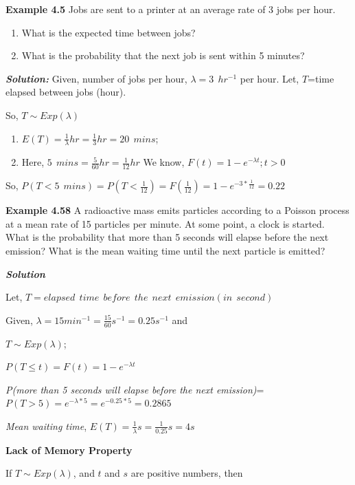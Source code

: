 \documentclass[
]{article}
\providecommand{\tightlist}{%
  \setlength{\itemsep}{0pt}\setlength{\parskip}{0pt}}
\begin{document}
\textbf{Example 4.5}\citep{baron_probability_2019} Jobs are sent to a printer at an average rate of 3 jobs per hour.

\begin{enumerate}
\def\labelenumi{(\alph{enumi})}
\item
  What is the expected time between jobs?
\item
  What is the probability that the next job is sent within 5 minutes?
\end{enumerate}

\textbf{\emph{Solution:}} Given, number of jobs per hour, \(\lambda=3\ \ hr^{-1}\) per hour. Let, \(T\)=time elapsed between jobs (hour).

So, \(T\sim Exp(\lambda)\)

\begin{enumerate}
\def\labelenumi{(\alph{enumi})}
\tightlist
\item
  \(E(T)=\frac{1}{\lambda} hr=\frac{1}{3} hr=20\ \ mins\);
\item
  Here, \(5 \ \ mins=\frac{5}{60} hr=\frac{1}{12} hr\) We know, \(F(t)=1-e^{-\lambda t}; t>0\)
\end{enumerate}

So, \(P(T<5 \ \ mins)=P(T<\frac{1}{12})=F(\frac{1}{12})=1-e^{-3*\frac{1}{12}}=0.22\)

\textbf{Example 4.58} \citep{navidi_statistics_2011} A radioactive mass emits particles according to a Poisson process at a mean rate of 15 particles per minute. At some point, a clock is started. What is the probability that more than 5 seconds will elapse before the next emission? What is the mean waiting time until the next particle is emitted?

\textbf{\emph{Solution}}

Let, \(T=elapsed \ \ time \ \ before \ \ the \ \ next \ \ emission (in \ \ second)\)

Given, \(\lambda=15 min^{-1}=\frac{15}{60} s^{-1}=0.25 s^{-1}\) and

\(T\sim Exp(\lambda)\);

\(P(T\le t)=F(t)=1-e^{-\lambda t}\)

\emph{P(more than 5 seconds will elapse before the next emission)}=\(P(T>5)=e^{-\lambda * 5}=e^{-0.25*5}=0.2865\)

\emph{Mean waiting time}, \(E(T)=\frac{1}{\lambda} s=\frac{1}{0.25}s=4s\)

\textbf{Lack of Memory Property}

If \(T \sim Exp(\lambda)\), and \(t\) and \(s\) are positive numbers, then
\end{document}
